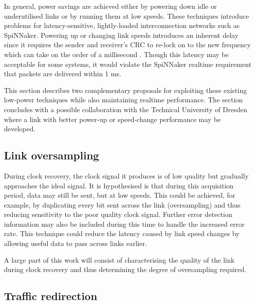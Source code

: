 		In general, power savings are achieved either by powering down idle or
		underutilised links or by running them at low speeds. These techniques
		introduce problems for latency-sensitive, lightly-loaded interconnection
		networks such as SpiNNaker. Powering up or changing link speeds introduces
		an inherent delay since it requires the sender and receiver's CRC to re-lock
		on to the new frequency which can take on the order of a millisecond
		\cite{xilinx14}. Though this latency may be acceptable for some systems, it
		would violate the SpiNNaker realtime requirement that packets are delivered
		within 1 ms.
		
		This section describes two complementary proposals for exploiting these
		existing low-power techniques while also maintaining realtime performance.
		The section concludes with a possible collaboration with the Technical
		University of Dresden where a link with better power-up or speed-change
		performance may be developed.
		
		\subsection{Link oversampling}
			
			
			During clock recovery, the clock signal it produces is of low quality but
			gradually approaches the ideal signal. It is hypothesised is that during
			this acquisition period, data may still be sent, but at low speeds.  This
			could be achieved, for example, by duplicating every bit sent across the
			link (oversampling) and thus reducing sensitivity to the poor quality
			clock signal.  Further error detection information may also be included
			during this time to handle the increased error rate. This technique could
			reduce the latency caused by link speed changes by allowing useful data to
			pass across links earlier.
			
			A large part of this work will consist of characterising the quality of
			the link during clock recovery and thus determining the degree of
			oversampling required.
		
		\subsection{Traffic redirection}
			
			

